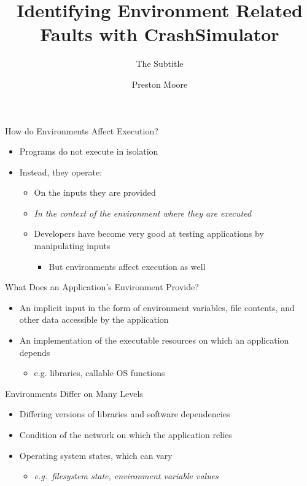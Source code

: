 \documentclass[pdf]{beamer}
\title{Identifying Environment Related Faults with CrashSimulator}
\subtitle{The Subtitle}
\author{Preston Moore}
\begin{document}
\begin{frame}
  \titlepage{}
\end{frame}


\begin{frame}{How do Environments Affect Execution?}
  \begin{itemize}
  \item{Programs do not execute in isolation}
  \item{Instead, they operate:}
    \begin{itemize}
    \item{On the inputs they are provided}
    \item{\textit{In the context of the environment where they are executed}}
    \item{Developers have become very good at testing applications by
        manipulating inputs}
      \begin{itemize}
        \item{But environments affect execution as well}
      \end{itemize}
    \end{itemize}
  \end{itemize}
\end{frame}


\begin{frame}{What Does an Application's Environment Provide?}
  \begin{itemize}
  \item{An implicit input in the form of environment variables, file
      contents, and other data accessible by the application}
  \item{An implementation of the executable resources on which an application depends}
    \begin{itemize}
    \item{e.g. libraries, callable OS functions}
    \end{itemize}
  \end{itemize}
\end{frame}


\begin{frame}{Environments Differ on Many Levels}
  \begin{itemize}
  \item{Differing versions of libraries and software dependencies}
  \item{Condition of the network on which the application relies}
  \item{Operating system states, which can vary}
    \begin{itemize}
    \item{\textit{e.g.\ filesystem state, environment variable values}}
    \end{itemize}
  \end{itemize}
\end{frame}
\end{document}
